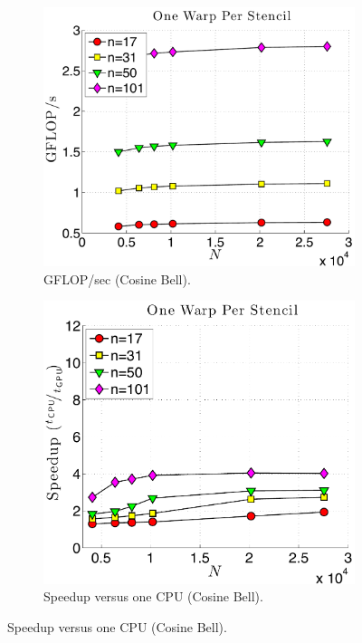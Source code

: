 \begin{figure}
\centering
\begin{subfigure}[t]{0.46\textwidth}
\includegraphics[width=\textwidth]{../figures/keeneland_results/alltoallv_cosine/gflops_gpu_1proc_oneWarpPerStencil.pdf}
\caption{GFLOP/sec (Cosine Bell).}
\label{fig:gflops_gpu_1proc_oneWarp_keeneland_cosine}
\end{subfigure} 
\quad
\begin{subfigure}[t]{0.425\textwidth}
\includegraphics[width=\textwidth]{../figures/keeneland_results/alltoallv_cosine/speedup_1proc_oneWarpPerStencil.pdf}
\caption{Speedup versus one CPU (Cosine Bell).}
\label{fig:speedup_1proc_oneWarp_keeneland_cosine}
\end{subfigure} 


\end{figure}

